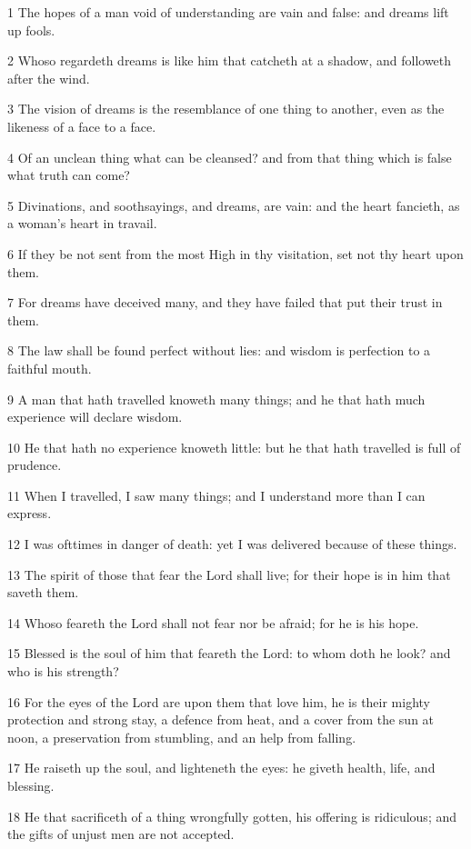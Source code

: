 \par 1 The hopes of a man void of understanding are vain and false: and dreams lift up fools.
\par 2 Whoso regardeth dreams is like him that catcheth at a shadow, and followeth after the wind.
\par 3 The vision of dreams is the resemblance of one thing to another, even as the likeness of a face to a face.
\par 4 Of an unclean thing what can be cleansed? and from that thing which is false what truth can come?
\par 5 Divinations, and soothsayings, and dreams, are vain: and the heart fancieth, as a woman's heart in travail.
\par 6 If they be not sent from the most High in thy visitation, set not thy heart upon them.
\par 7 For dreams have deceived many, and they have failed that put their trust in them.
\par 8 The law shall be found perfect without lies: and wisdom is perfection to a faithful mouth.
\par 9 A man that hath travelled knoweth many things; and he that hath much experience will declare wisdom.
\par 10 He that hath no experience knoweth little: but he that hath travelled is full of prudence.
\par 11 When I travelled, I saw many things; and I understand more than I can express.
\par 12 I was ofttimes in danger of death: yet I was delivered because of these things.
\par 13 The spirit of those that fear the Lord shall live; for their hope is in him that saveth them.
\par 14 Whoso feareth the Lord shall not fear nor be afraid; for he is his hope.
\par 15 Blessed is the soul of him that feareth the Lord: to whom doth he look? and who is his strength?
\par 16 For the eyes of the Lord are upon them that love him, he is their mighty protection and strong stay, a defence from heat, and a cover from the sun at noon, a preservation from stumbling, and an help from falling.
\par 17 He raiseth up the soul, and lighteneth the eyes: he giveth health, life, and blessing.
\par 18 He that sacrificeth of a thing wrongfully gotten, his offering is ridiculous; and the gifts of unjust men are not accepted.
